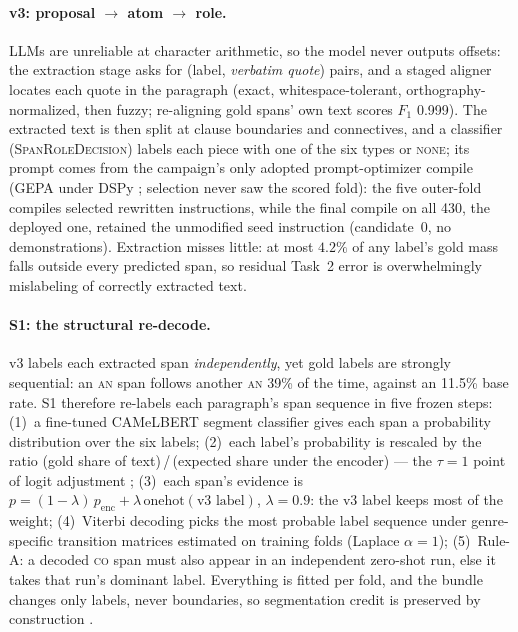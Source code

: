 \documentclass[11pt]{article}
\newcommand{\lab}[1]{\textsc{#1}}
\newcommand{\co}{\lab{co}}
\newcommand{\an}{\lab{an}}
\begin{document}
\paragraph{v3: proposal $\rightarrow$ atom $\rightarrow$ role.} LLMs are
unreliable at character arithmetic, so the model never outputs offsets:
the extraction stage asks for (label, \emph{verbatim quote}) pairs, and
a staged aligner locates each quote in the paragraph (exact,
whitespace-tolerant, orthography-normalized, then fuzzy; re-aligning
gold spans' own text scores $F_1$ 0.999). The extracted text
is then split at clause boundaries and connectives, and a classifier
(\textsc{SpanRoleDecision}) labels each piece with one of the six types
or \lab{none}; its prompt comes from the campaign's only adopted
prompt-optimizer compile (GEPA \citep{agrawal-etal-2026-gepa} under
DSPy \citep{khattab-etal-2024-dspy}; selection never saw the scored
fold): the five outer-fold compiles selected rewritten instructions,
while the final compile on all 430, the deployed one, retained the
unmodified seed instruction (candidate~0, no demonstrations). Extraction misses little: at most $4.2\%$ of any label's
gold mass falls outside every predicted span, so residual Task~2 error
is overwhelmingly mislabeling of correctly extracted text.

\paragraph{S1: the structural re-decode.} v3 labels each extracted span
\emph{independently}, yet gold labels are strongly sequential: an \an{}
span follows another \an{} 39\% of the time, against an 11.5\% base
rate. S1 therefore re-labels each paragraph's span sequence in five
frozen steps: (1)~a fine-tuned CAMeLBERT segment classifier gives each
span a probability distribution over the six labels; (2)~each
label's probability is rescaled by the
ratio (gold share of text)\,/\,(expected share under the encoder) ---
the $\tau{=}1$ point of logit adjustment \citep{menon-etal-2021-logit};
(3)~each span's evidence is $p = (1{-}\lambda)\,p_{\text{enc}} +
\lambda\,\text{onehot}(\text{v3 label})$, $\lambda{=}0.9$: the v3 label
keeps most of the weight;
(4)~Viterbi decoding \citep{viterbi-1967-error} picks the most probable
label sequence under genre-specific transition matrices estimated on
training folds (Laplace $\alpha{=}1$); (5)~Rule-A: a
decoded \co{} span must also appear in an independent zero-shot run,
else it takes that run's dominant label. Everything is fitted per fold,
and the bundle
changes only labels, never boundaries, so segmentation credit is
preserved by construction \citep{widmoser-etal-2021-randomized}.
\end{document}
